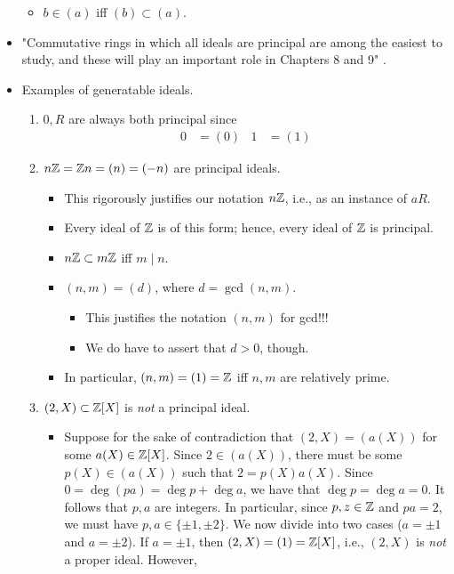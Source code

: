 \documentclass[../notes.tex]{subfiles}
\begin{document}
\begin{itemize}
\begin{itemize}
\begin{itemize}
        \end{itemize}
        \item $b\in(a)$ iff $(b)\subset(a)$.
    \end{itemize}
    \item "Commutative rings in which all ideals are principal are among the easiest to study, and these will play an important role in Chapters 8 and 9" \parencite[252]{bib:DummitFoote}.
    \item Examples of generatable ideals.
    \begin{enumerate}
        \item $0,R$ are always both principal since
        \begin{align*}
            0 &= (0)&
            1 &= (1)
        \end{align*}
        \item $n\mathbb{Z}=\mathbb{Z} n=(n)=(-n)$ are principal ideals.
        \begin{itemize}
            \item This rigorously justifies our notation $n\mathbb{Z}$, i.e., as an instance of $aR$.
            \item Every ideal of $\mathbb{Z}$ is of this form; hence, every ideal of $\mathbb{Z}$ is principal.
            \item $n\mathbb{Z}\subset m\mathbb{Z}$ iff $m\mid n$.
            \item $(n,m)=(d)$, where $d=\gcd(n,m)$.
            \begin{itemize}
                \item This justifies the notation $(n,m)$ for gcd!!!
                \item We do have to assert that $d>0$, though.
            \end{itemize}
            \item In particular, $(n,m)=(1)=\mathbb{Z}$ iff $n,m$ are relatively prime.
        \end{itemize}
        \item $(2,X)\subset\mathbb{Z}[X]$ is \emph{not} a principal ideal.
        \begin{itemize}
            \item Suppose for the sake of contradiction that $(2,X)=(a(X))$ for some $a(X)\in\mathbb{Z}[X]$. Since $2\in(a(X))$, there must be some $p(X)\in(a(X))$ such that $2=p(X)a(X)$. Since $0=\deg(pa)=\deg p+\deg a$, we have that $\deg p=\deg a=0$. It follows that $p,a$ are integers. In particular, since $p,z\in\mathbb{Z}$ and $pa=2$, we must have $p,a\in\{\pm 1,\pm 2\}$. We now divide into two cases ($a=\pm 1$ and $a=\pm 2$). If $a=\pm 1$, then $(2,X)=(1)=\mathbb{Z}[X]$, i.e., $(2,X)$ is \emph{not} a proper ideal. However,

\end{itemize}
\end{enumerate}
\end{itemize}
\end{document}
